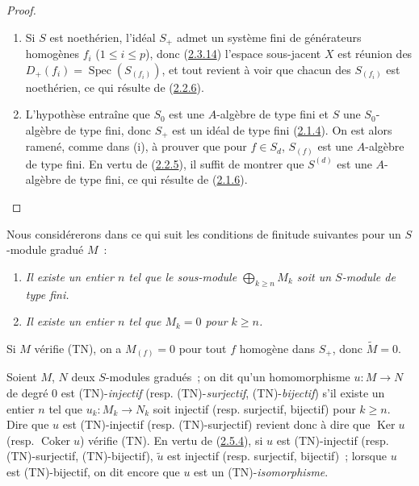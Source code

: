 \begin{proof}
\begin{enumerate}
  \item[\rm(i)] Si $S$ est noethérien, l'idéal $S_+$ admet un système fini de
    générateurs homogènes $f_i$ ($1\leq i\leq p$), donc
    (\hyperref[II.2.3.14-fr]{2.3.14}) l'espace sous-jacent $X$ est réunion des
    $D_+(f_i)=\operatorname{Spec}(S_{(f_i)})$, et tout revient à voir que
    chacun des $S_{(f_i)}$ est noethérien, ce qui résulte de
    (\hyperref[II.2.2.6-fr]{2.2.6}).
  \item[\rm(ii)] L'hypothèse entraîne que $S_0$ est une $A$-algèbre de type
    fini et $S$ une $S_0$-algèbre de type fini, donc $S_+$ est un idéal de
    type fini (\hyperref[II.2.1.4-fr]{2.1.4}). On est alors ramené, comme dans
    (i), à prouver que pour $f\in S_d$, $S_{(f)}$ est une $A$-algèbre de type
    fini. En vertu de (\hyperref[II.2.2.5-fr]{2.2.5}), il suffit de montrer
    que $S^{(d)}$ est une $A$-algèbre de type fini, ce qui résulte de
    (\hyperref[II.2.1.6-fr]{2.1.6}).
\end{enumerate}
\end{proof}

\begin{env}[2.7.2]
\label{II.2.7.2-fr}
Nous considérerons dans ce qui suit les conditions de finitude suivantes pour
un $S$-module gradué $M$~:
\begin{enumerate}
  \item[\rm(TF)] \emph{Il existe un entier $n$ tel que le sous-module
    $\bigoplus_{k\geq n}M_k$ soit un $S$-module de type fini.}
  \item[\rm(TN)] \emph{Il existe un entier $n$ tel que $M_k=0$ pour $k\geq n$.}
\end{enumerate}

Si $M$ vérifie (TN), on a $M_{(f)}=0$ pour tout $f$ homogène dans $S_+$,
donc $\widetilde{M}=0$.

Soient $M$, $N$ deux $S$-modules gradués~; on dit qu'un homomorphisme
$u:M\to N$ de degré $0$ est (TN)-\emph{injectif} (resp.
(TN)-\emph{surjectif}, (TN)-\emph{bijectif}) s'il existe un entier $n$ tel
que $u_k:M_k\to N_k$ soit injectif (resp. surjectif, bijectif) pour
$k\geq n$. Dire que $u$ est (TN)-injectif (resp. (TN)-surjectif) revient donc
à dire que $\operatorname{Ker}u$ (resp. $\operatorname{Coker}u$) vérifie
(TN). En vertu de (\hyperref[II.2.5.4-fr]{2.5.4}), si $u$ est (TN)-injectif
(resp. (TN)-surjectif, (TN)-bijectif), $\widetilde{u}$ est injectif (resp.
surjectif, bijectif)~; lorsque $u$ est (TN)-bijectif, on dit encore que $u$
est un (TN)-\emph{isomorphisme}.
\end{env}

